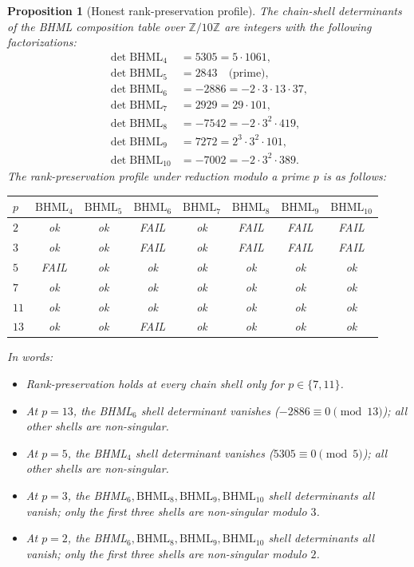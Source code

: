 \documentclass[11pt,reqno]{amsart}
\theoremstyle{plain}
\newtheorem{proposition}[theorem]{Proposition}
\theoremstyle{definition}
\theoremstyle{remark}
\newcommand{\Z}{\mathbb{Z}}
\newcommand{\BHML}{\mathrm{BHML}}
\begin{document}
\begin{proposition}[Honest rank-preservation profile]
\label{prop:rank-honest}
The chain-shell determinants of the BHML composition table over
$\Z/10\Z$ are integers with the following factorizations:
\begin{align*}
\det \BHML_{4} &= 5305 = 5 \cdot 1061, \\
\det \BHML_{5} &= 2843 \quad \text{(prime)}, \\
\det \BHML_{6} &= -2886 = -2 \cdot 3 \cdot 13 \cdot 37, \\
\det \BHML_{7} &= 2929 = 29 \cdot 101, \\
\det \BHML_{8} &= -7542 = -2 \cdot 3^{2} \cdot 419, \\
\det \BHML_{9} &= 7272 = 2^{3} \cdot 3^{2} \cdot 101, \\
\det \BHML_{10} &= -7002 = -2 \cdot 3^{2} \cdot 389.
\end{align*}
The rank-preservation profile under reduction modulo a prime $p$ is
as follows:

\begin{center}
\begin{tabular}{l c c c c c c c}
\toprule
$p$ & $\BHML_{4}$ & $\BHML_{5}$ & $\BHML_{6}$ & $\BHML_{7}$
    & $\BHML_{8}$ & $\BHML_{9}$ & $\BHML_{10}$ \\
\midrule
$2$  & ok       & ok       & FAIL     & ok       & FAIL     & FAIL     & FAIL     \\
$3$  & ok       & ok       & FAIL     & ok       & FAIL     & FAIL     & FAIL     \\
$5$  & FAIL     & ok       & ok       & ok       & ok       & ok       & ok       \\
$7$  & ok       & ok       & ok       & ok       & ok       & ok       & ok       \\
$11$ & ok       & ok       & ok       & ok       & ok       & ok       & ok       \\
$13$ & ok       & ok       & FAIL     & ok       & ok       & ok       & ok       \\
\bottomrule
\end{tabular}
\end{center}

In words:
\begin{itemize}
\item Rank-preservation holds at every chain shell only for
$p \in \{7, 11\}$.
\item At $p = 13$, the BHML$_{6}$ shell determinant vanishes
($-2886 \equiv 0 \pmod{13}$); all other shells are non-singular.
\item At $p = 5$, the BHML$_{4}$ shell determinant vanishes
($5305 \equiv 0 \pmod{5}$); all other shells are non-singular.
\item At $p = 3$, the BHML$_{6}, \BHML_{8}, \BHML_{9}, \BHML_{10}$
shell determinants all vanish; only the first three shells are
non-singular modulo $3$.
\item At $p = 2$, the BHML$_{6}, \BHML_{8}, \BHML_{9}, \BHML_{10}$
shell determinants all vanish; only the first three shells are
non-singular modulo $2$.
\end{itemize}
\end{proposition}
\end{document}
